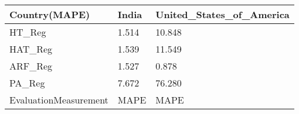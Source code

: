 \begin{tabular}{lll}
\toprule
Country(MAPE) &  India & United\_States\_of\_America \\
\midrule
HT\_Reg                &  1.514 &                   10.848 \\
HAT\_Reg               &  1.539 &                   11.549 \\
ARF\_Reg               &  1.527 &                    0.878 \\
PA\_Reg                &  7.672 &                   76.280 \\
EvaluationMeasurement &   MAPE &                     MAPE \\
\bottomrule
\end{tabular}
